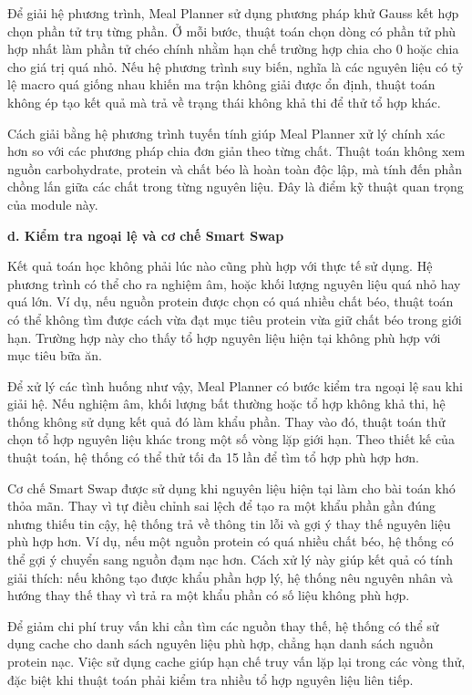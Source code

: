 Để giải hệ phương trình, Meal Planner sử dụng phương pháp khử Gauss kết hợp chọn phần tử trụ từng phần. Ở mỗi bước, thuật toán chọn dòng có phần tử phù hợp nhất làm phần tử chéo chính nhằm hạn chế trường hợp chia cho 0 hoặc chia cho giá trị quá nhỏ. Nếu hệ phương trình suy biến, nghĩa là các nguyên liệu có tỷ lệ macro quá giống nhau khiến ma trận không giải được ổn định, thuật toán không ép tạo kết quả mà trả về trạng thái không khả thi để thử tổ hợp khác.

Cách giải bằng hệ phương trình tuyến tính giúp Meal Planner xử lý chính xác hơn so với các phương pháp chia đơn giản theo từng chất. Thuật toán không xem nguồn carbohydrate, protein và chất béo là hoàn toàn độc lập, mà tính đến phần chồng lấn giữa các chất trong từng nguyên liệu. Đây là điểm kỹ thuật quan trọng của module này.

\textbf{d. Kiểm tra ngoại lệ và cơ chế Smart Swap}

Kết quả toán học không phải lúc nào cũng phù hợp với thực tế sử dụng. Hệ phương trình có thể cho ra nghiệm âm, hoặc khối lượng nguyên liệu quá nhỏ hay quá lớn. Ví dụ, nếu nguồn protein được chọn có quá nhiều chất béo, thuật toán có thể không tìm được cách vừa đạt mục tiêu protein vừa giữ chất béo trong giới hạn. Trường hợp này cho thấy tổ hợp nguyên liệu hiện tại không phù hợp với mục tiêu bữa ăn.

Để xử lý các tình huống như vậy, Meal Planner có bước kiểm tra ngoại lệ sau khi giải hệ. Nếu nghiệm âm, khối lượng bất thường hoặc tổ hợp không khả thi, hệ thống không sử dụng kết quả đó làm khẩu phần. Thay vào đó, thuật toán thử chọn tổ hợp nguyên liệu khác trong một số vòng lặp giới hạn. Theo thiết kế của thuật toán, hệ thống có thể thử tối đa 15 lần để tìm tổ hợp phù hợp hơn.

Cơ chế Smart Swap được sử dụng khi nguyên liệu hiện tại làm cho bài toán khó thỏa mãn. Thay vì tự điều chỉnh sai lệch để tạo ra một khẩu phần gần đúng nhưng thiếu tin cậy, hệ thống trả về thông tin lỗi và gợi ý thay thế nguyên liệu phù hợp hơn. Ví dụ, nếu một nguồn protein có quá nhiều chất béo, hệ thống có thể gợi ý chuyển sang nguồn đạm nạc hơn. Cách xử lý này giúp kết quả có tính giải thích: nếu không tạo được khẩu phần hợp lý, hệ thống nêu nguyên nhân và hướng thay thế thay vì trả ra một khẩu phần có số liệu không phù hợp.

Để giảm chi phí truy vấn khi cần tìm các nguồn thay thế, hệ thống có thể sử dụng cache cho danh sách nguyên liệu phù hợp, chẳng hạn danh sách nguồn protein nạc. Việc sử dụng cache giúp hạn chế truy vấn lặp lại trong các vòng thử, đặc biệt khi thuật toán phải kiểm tra nhiều tổ hợp nguyên liệu liên tiếp.

